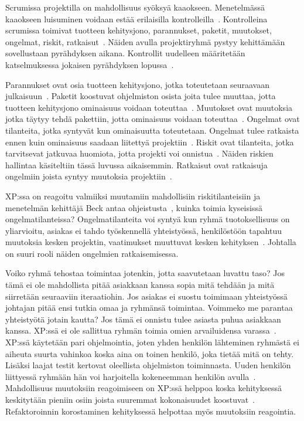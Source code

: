 \documentclass[finnish]{tktltiki2}
\theoremstyle{definition}
\theoremstyle{remark}
\begin{document}
Scrumissa projektilla on mahdollisuus syöksyä kaaokseen. Menetelmässä kaaokseen luisuminen voidaan estää erilaisilla kontrolleilla~\cite{schwaber1995scrum}. Kontrolleina scrumissa toimivat tuotteen kehitysjono, parannukset, paketit, muutokset, ongelmat, riskit, ratkaisut~\cite{schwaber1995scrum}. Näiden avulla projektiryhmä pystyy kehittämään sovellustaan pyrähdyksen aikana. Kontrollit uudelleen määritetään katselmuksessa jokaisen pyrähdyksen lopussa~\cite{schwaber1995scrum}.

Parannukset ovat osia tuotteen kehitysjono, jotka toteutetaan seuraavaan julkaisuun~\cite{schwaber1995scrum}. Paketit koostuvat ohjelmiston osista joita tulee muuttaa, jotta tuotteen kehitysjono ominaisuus voidaan toteuttaa~\cite{schwaber1995scrum}. Muutokset ovat muutoksia jotka täytyy tehdä pakettiin, jotta ominaisuus voidaan toteuttaa~\cite{schwaber1995scrum}. Ongelmat ovat tilanteita, jotka syntyvät kun ominaisuutta toteutetaan. Ongelmat tulee ratkaista ennen kuin ominaisuus saadaan liitettyä projektiin~\cite{schwaber1995scrum}. Riskit ovat tilanteita, jotka tarvitsevat jatkuvaa huomiota, jotta projekti voi onnistua~\cite{schwaber1995scrum}. Näiden riskien hallintaa käsiteltiin tässä luvussa aikaisemmin. Ratkaisut ovat ratkaisuja ongelmiin joista syntyy muutoksia projektiin~\cite{schwaber1995scrum}.

XP:ssa on reagoitu valmiiksi muutamiin mahdollisiin riskitilanteisiin ja menetelmän kehittäjä Beck antaa ohjeistusta~\cite{796139}, kuinka toimia kyseisissä ongelmatilanteissa? Ongelmatilanteita voi syntyä kun ryhmä tuotoksellisuus on yliarvioitu, asiakas ei tahdo työskennellä yhteistyössä, henkilöstöön tapahtuu muutoksia kesken projektin, vaatimukset muuttuvat kesken kehityksen~\cite{796139}. Johtalla on suuri rooli näiden ongelmien ratkaisemisessa.

Voiko ryhmä tehostaa toimintaa jotenkin, jotta saavutetaan luvattu taso? Jos tämä ei ole mahdollista pitää asiakkaan kanssa sopia mitä tehdään ja mitä siirretään seuraaviin iteraatiohin. Jos asiakas ei suostu toimimaan yhteistyössä johtajan pitää ensi tutkia omaa ja ryhmänsä toimintaa. Voimmeko me parantaa yhteistyötä jotain kautta? Jos tämä ei onnistu tulee asiasta puhua asiakkaan kanssa. XP:ssä ei ole sallittua ryhmän toimia omien arvailuidensa varassa~\cite{796139}. XP:ssä käytetään pari ohjelmointia, joten yhden henkilön lähteminen ryhmästä ei aiheuta suurta vahinkoa koska aina on toinen henkilö, joka tietää mitä on tehty. Lisäksi laajat testit kertovat oleellista ohjelmiston toiminnasta. Uuden henkilön liittyessä ryhmään hän voi harjoitella kokeneemman henkilön avulla~\cite{796139}. Mahdollisuus muutoksiin reagoimiseen on XP:ssä helppoa koska kehityksessä keskitytään pieniin osiin joista suuremmat kokonaisuudet koostuvat~\cite{796139}. Refaktoroinnin korostaminen kehityksessä helpottaa myös muutoksiin reagointia.   
 
\end{document}
